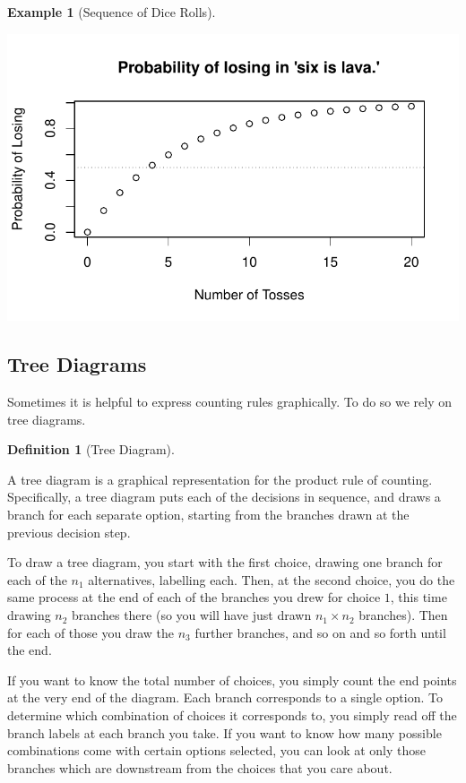 \documentclass[
  letterpaper,
  DIV=11,
  numbers=noendperiod]{scrreprt}
\theoremstyle{definition}
\newtheorem{definition}{Definition}[chapter]
\theoremstyle{definition}
\theoremstyle{definition}
\newtheorem{example}{Example}[chapter]
\theoremstyle{remark}
\begin{document}
\begin{example}[Sequence of Dice
Rolls]
\begin{tcolorbox}[enhanced jigsaw, colback=white, breakable, rightrule=.15mm, leftrule=.75mm, toprule=.15mm, left=2mm, arc=.35mm, opacityback=0, bottomrule=.15mm]
\includegraphics{notes/chapter3_files/figure-pdf/unnamed-chunk-2-1.pdf}

\end{tcolorbox}

\end{example}

\subsection{Tree Diagrams}\label{tree-diagrams}

Sometimes it is helpful to express counting rules graphically. To do so
we rely on tree diagrams.

\begin{definition}[Tree
Diagram]\protect\hypertarget{def-tree-diagram}{}\label{def-tree-diagram}

A tree diagram is a graphical representation for the product rule of
counting. Specifically, a tree diagram puts each of the decisions in
sequence, and draws a branch for each separate option, starting from the
branches drawn at the previous decision step.

\end{definition}

To draw a tree diagram, you start with the first choice, drawing one
branch for each of the \(n_1\) alternatives, labelling each. Then, at
the second choice, you do the same process at the end of each of the
branches you drew for choice \(1\), this time drawing \(n_2\) branches
there (so you will have just drawn \(n_1\times n_2\) branches). Then for
each of those you draw the \(n_3\) further branches, and so on and so
forth until the end.

If you want to know the total number of choices, you simply count the
end points at the very end of the diagram. Each branch corresponds to a
single option. To determine which combination of choices it corresponds
to, you simply read off the branch labels at each branch you take. If
you want to know how many possible combinations come with certain
options selected, you can look at only those branches which are
downstream from the choices that you care about.
\end{document}
